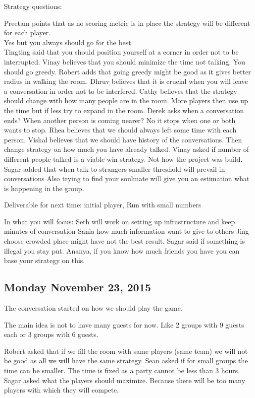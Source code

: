Strategy questions:



Preetam points that as no scoring metric is in place the strategy will be different 
for each player.\\
Yes but you always should go for the best.\\
Tingting said that you should position yourself at a corner in order not to be interrupted.
Vinay believes that you should minimize the time not talking. You should go greedy.
Robert adds that going greedy might be good as it gives better radius in walking the room.
Dhruv believes that it is crucial when you will leave a conversation in order not 
to be interfered.
Cathy believes that the strategy should change with how many people are in the 
room. More players then use up the time but if less try to expand in the room.
Derek asks when a conversation ends? When another person is coming nearer? No it 
stops when one or both wants to stop.
Rhea believes that we should always left some time with each person.
Vishal believes that we should have history of the conversations. Then change 
strategy on how much you have already talked.
Vinay asked if number of different people talked is a viable win strategy. Not 
how the project was build.
Sagar added that when talk to strangers smaller threshold will prevail in conversations
Also trying to find your soulmate will give you an estimation what is happening in the group.

Deliverable for next time: initial player, Run with small numbers

In what you will focus:
Seth will work on setting up infrastructure and keep minutes of conversation
Sania how much information want to give to others
Jing choose crowded place might have not the best result.
Sagar said if something is illegal you stay put. 
Ananya, if you know how much friends you have you can base your strategy on this.

\subsection{Monday November 23, 2015}
The conversation started on how we should play the game.

The main idea is not to have many guests for now. Like 2 groups with 9 guests each or 3 groups with 6 guests.

Robert asked that if we fill the room with same players (same team) we will not be good as all we will have the same strategy.
Sean asked if for small groups the time can be smaller. The time is fixed as a party cannot be less than 3 hours.
Sagar asked what the players should maximize. Because there will be too many players with which they will compete.


